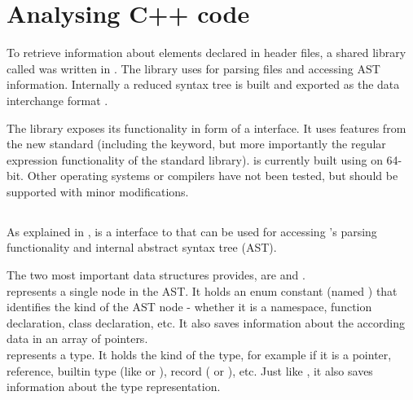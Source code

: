 \chapter{Analysing C++ code}
\label{chap:AnalysingCPP}

To retrieve information about elements declared in  header files, a shared library called  was written in . The library uses  for parsing  files and accessing AST information. Internally a reduced syntax tree is built and exported as the data interchange format .

The library exposes its functionality in form of a  interface. It uses features from the new  standard  (including the  keyword, but more importantly the regular expression functionality of the standard library).  is currently built using  on  64-bit. Other operating systems or compilers have not been tested, but should be supported with minor modifications.

\section{}

As explained in ,  is a  interface to  that can be used for accessing 's parsing functionality and internal abstract syntax tree (AST).

The two most important data structures  provides, are  and .
\\ represents a single node in the AST. It holds an enum constant (named ) that identifies the kind of the AST node - whether it is a namespace, function declaration, class declaration, etc. It also saves information about the according  data in an array of  pointers.
\\ represents a  type. It holds the kind of the type, for example if it is a pointer, reference, builtin type (like  or ), record ( or ), etc. Just like , it also saves information about the  type representation.


